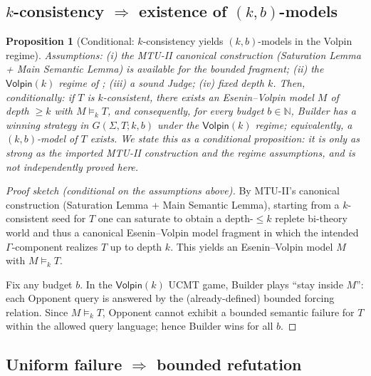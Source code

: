 \documentclass[11pt]{article}
\theoremstyle{definition}
\theoremstyle{plain}
\newtheorem{proposition}[definition]{Proposition}
\newcommand{\Sig}{\Sigma}
\newcommand{\N}{\mathbb{N}}
\begin{document}
\subsection{$k$-consistency $\Rightarrow$ existence of $(k,b)$-models}

\begin{proposition}[Conditional: $k$-consistency yields $(k,b)$-models in the Volpin regime]
\label{thm:kcons-exists-kb}
\emph{Assumptions:} (i) the MTU-II canonical construction (Saturation Lemma + Main Semantic Lemma)
is available for the bounded fragment; (ii) the $\mathsf{Volpin}(k)$ regime of
; (iii) a sound Judge; (iv) fixed depth $k$.
\emph{Then, conditionally:} if $T$ is $k$-consistent, there exists an Esenin--Volpin model $M$ of
depth $\ge k$ with $M \models_k T$, and consequently, for every budget $b\in\N$, Builder has a
winning strategy in $G(\Sig,T;k,b)$ under the $\mathsf{Volpin}(k)$ regime; equivalently, a
$(k,b)$-model of $T$ exists. We state this as a conditional proposition: it is only as strong as the
imported MTU-II construction and the regime assumptions, and is not independently proved here.
\end{proposition}

\begin{proof}[Proof sketch (conditional on the assumptions above)]
By MTU-II's canonical construction (Saturation Lemma + Main Semantic Lemma),
starting from a $k$-consistent seed for $T$ one can saturate to obtain a depth-$\le k$
replete bi-theory world and thus a canonical Esenin--Volpin model fragment in which the
intended $\Gamma$-component realizes $T$ up to depth $k$.
This yields an Esenin--Volpin model $M$ with $M \models_k T$.

Fix any budget $b$. In the $\mathsf{Volpin}(k)$ UCMT game, Builder plays ``stay inside $M$'':
each Opponent query is answered by the (already-defined) bounded forcing relation.
Since $M \models_k T$, Opponent cannot exhibit a bounded semantic failure for $T$ within the
allowed query language; hence Builder wins for all $b$.
\end{proof}

\subsection{Uniform failure $\Rightarrow$ bounded refutation}
\end{document}
